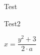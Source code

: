\documentclass[xetex,a4paper,14pt]{extarticle} %
\begin{document}
Test\par
Test2

$x=\dfrac{y^2+3}{2\cdot a}$
\end{document}
